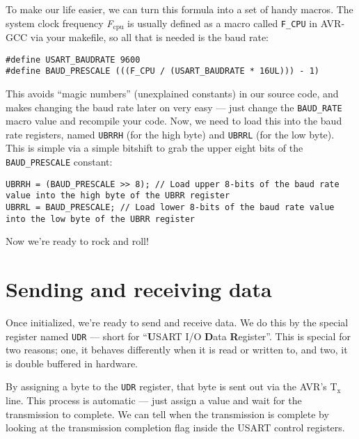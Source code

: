 \documentclass[a4paper,oneside,notitlepage]{book}
\newcommand{\subscript}[1]{\ensuremath{_{\textrm{#1}}}}
\begin{document}
To make our life easier, we can turn this formula into a set of handy macros. The system clock frequency \emph{F\subscript{cpu}} is usually defined as a macro called \texttt{F\_CPU} in AVR-GCC via your makefile, so all that is needed is the baud rate:

\begin{center}
\begin{lstlisting}
#define USART_BAUDRATE 9600
#define BAUD_PRESCALE (((F_CPU / (USART_BAUDRATE * 16UL))) - 1)
\end{lstlisting}
\end{center}

This avoids ``magic numbers'' (unexplained constants) in our source code, and makes changing the baud rate later on very easy --- just change the \texttt{BAUD\_RATE} macro value and recompile your code. Now, we need to load this into the baud rate registers, named \texttt{UBRRH} (for the high byte) and \texttt{UBRRL} (for the low byte). This is simple via a simple bitshift to grab the upper eight bits of the \texttt{BAUD\_PRESCALE} constant:

\begin{center}
\begin{lstlisting}
UBRRH = (BAUD_PRESCALE >> 8); // Load upper 8-bits of the baud rate value into the high byte of the UBRR register
UBRRL = BAUD_PRESCALE; // Load lower 8-bits of the baud rate value into the low byte of the UBRR register
\end{lstlisting}
\end{center}

Now we're ready to rock and roll!


\chapter{Sending and receiving data}

Once initialized, we're ready to send and receive data. We do this by the special register named \texttt{UDR} --- short for ``\textbf{U}SART I/O \textbf{D}ata \textbf{R}egister''. This is special for two reasons; one, it behaves differently when it is read or written to, and two, it is double buffered in hardware.

By assigning a byte to the \texttt{UDR} register, that byte is sent out via the AVR's T\subscript{x} line. This process is automatic --- just assign a value and wait for the transmission to complete. We can tell when the transmission is complete by looking at the transmission completion flag inside the USART control registers.
\end{document}
